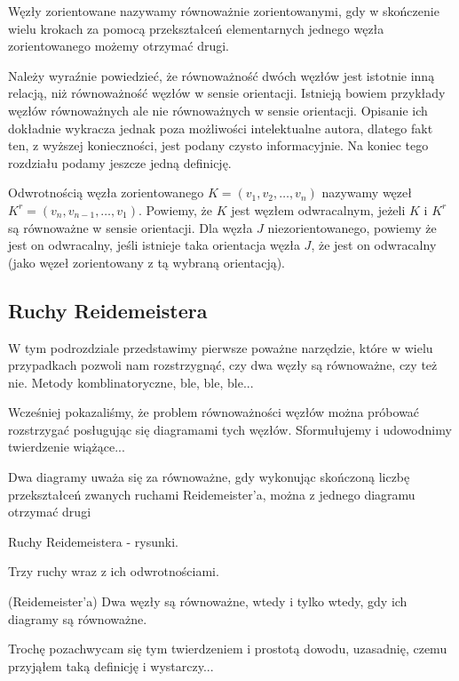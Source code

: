 \begin{definicja}
 Węzły zorientowane nazywamy równoważnie zorientowanymi, gdy w skończenie wielu krokach za pomocą przekształceń elementarnych jednego węzła zorientowanego
 możemy otrzymać drugi.
\end{definicja}
Należy wyraźnie powiedzieć, że równoważność dwóch węzłów jest istotnie inną relacją, niż równoważność węzłów w sensie orientacji. Istnieją bowiem przykłady węzłów równoważnych
ale nie równoważnych w sensie orientacji. Opisanie ich dokładnie wykracza jednak poza możliwości intelektualne autora, dlatego fakt ten, z wyższej konieczności, jest podany
czysto informacyjnie.
Na koniec tego rozdziału podamy jeszcze jedną definicję.
\begin{definicja}
 Odwrotnością węzła zorientowanego $K = (v_1, v_2, \ldots, v_n)$ nazywamy węzeł $K^r = (v_n, v_{n-1}, \ldots, v_1)$. Powiemy, że $K$ jest węzłem odwracalnym, jeżeli $K$ i $K^r$ są
 równoważne w sensie orientacji. Dla węzła $J$ niezorientowanego, powiemy że jest on odwracalny, jeśli istnieje taka orientacja węzła $J$, że jest on odwracalny (jako węzeł
 zorientowany z tą wybraną orientacją).
\end{definicja}
 
 
\subsection{Ruchy Reidemeistera}
W tym podrozdziale przedstawimy pierwsze poważne narzędzie, które w wielu przypadkach pozwoli nam rozstrzygnąć, czy dwa węzły są równoważne, czy też nie.
Metody komblinatoryczne, ble, ble, ble...
 
Wcześniej pokazaliśmy, że problem równoważności węzłów można próbować rozstrzygać posługując się diagramami tych węzłów. Sformułujemy i udowodnimy twierdzenie wiążące...
 
\begin{definicja}
 Dwa diagramy uważa się za równoważne, gdy wykonując skończoną liczbę przekształceń zwanych ruchami Reidemeister'a, można
 z jednego diagramu otrzymać drugi
\end{definicja}
 
 
\begin{definicja}
 Ruchy Reidemeistera - rysunki.
\end{definicja}
 
Trzy ruchy wraz z ich odwrotnościami.
 
\begin{twierdzenie}{(Reidemeister'a)}
Dwa węzły są równoważne, wtedy i tylko wtedy, gdy ich diagramy są równoważne.
\end{twierdzenie}
 
Trochę pozachwycam się tym twierdzeniem i prostotą dowodu, uzasadnię, czemu przyjąłem taką definicję i wystarczy...